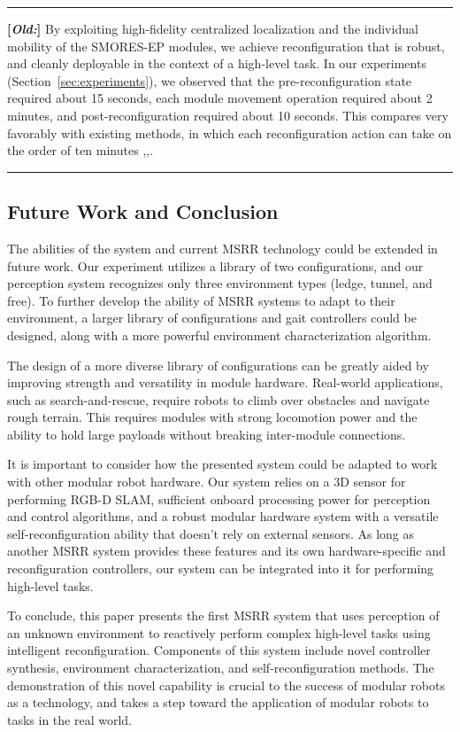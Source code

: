 \documentclass[conference]{IEEEtran}
\newcommand{\separator}{ \noindent \rule{\columnwidth}{1pt} }
\newenvironment{old}{\color{Maroon} \separator \textbf{[\textit{Old:}]} }{\ignorespacesafterend \separator}
\newcommand{\TODO}[1]{ {\bf \textcolor{red}{TODO:} #1 }}
\begin{document}
\begin{old}
By exploiting high-fidelity centralized localization and the individual mobility of the SMORES-EP modules, we achieve reconfiguration that is robust, and cleanly deployable in the context of a high-level task. In our experiments (Section~\ref{sec:experiments}), we observed that the pre-reconfiguration state required about 15 seconds, each module movement operation required about 2 minutes, and post-reconfiguration required about 10 seconds.
This compares very favorably with existing methods, in which each reconfiguration action can take on the order of ten minutes \cite{Yim2007},\cite{Murata2006},\cite{Rubenstein2004}.
\end{old}
%
\subsection{Future Work and Conclusion}
%
The abilities of the system and current MSRR technology could be extended in future work.  Our experiment utilizes a library of two configurations, and our perception system recognizes only three environment types (ledge, tunnel, and free).  To further develop the ability of MSRR systems to adapt to their environment, a larger library of configurations and gait controllers could be designed, along with a more powerful environment characterization algorithm.

The design of a more diverse library of configurations can be greatly aided by improving strength and versatility in module hardware. Real-world applications, such as search-and-rescue, require robots to climb over obstacles and navigate rough terrain. This requires modules with strong locomotion power and the ability to hold large payloads without breaking inter-module connections.

It is important to consider how the presented system could be adapted to work with other modular robot hardware. Our system relies on a 3D sensor for performing RGB-D SLAM, sufficient onboard processing power for perception and control algorithms, and a robust modular hardware system with a versatile self-reconfiguration ability that doesn't rely on external sensors. As long as another MSRR system provides these features and its own hardware-specific and reconfiguration controllers, our system can be integrated into it for performing high-level tasks.

To conclude, this paper presents the first MSRR system that uses perception of an unknown environment to reactively perform complex high-level tasks using intelligent reconfiguration. Components of this system include novel controller synthesis, environment characterization, and self-reconfiguration methods. The demonstration of this novel capability is crucial to the success of modular robots as a technology, and takes a step toward the application of modular robots to tasks in the real world.
%
%
\end{document}
